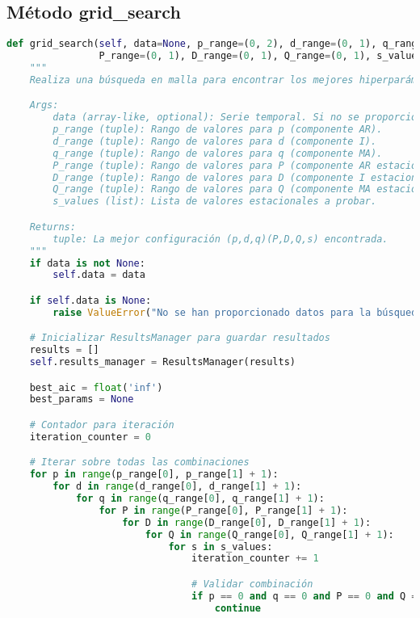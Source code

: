 \documentclass[12pt,letterpaper]{report}
\begin{document}
\subsection{Método grid\_search}
\begin{lstlisting}[language=python]
def grid_search(self, data=None, p_range=(0, 2), d_range=(0, 1), q_range=(0, 2),
                P_range=(0, 1), D_range=(0, 1), Q_range=(0, 1), s_values=[12]):
    """
    Realiza una búsqueda en malla para encontrar los mejores hiperparámetros.

    Args:
        data (array-like, optional): Serie temporal. Si no se proporciona, se usan los datos del constructor.
        p_range (tuple): Rango de valores para p (componente AR).
        d_range (tuple): Rango de valores para d (componente I).
        q_range (tuple): Rango de valores para q (componente MA).
        P_range (tuple): Rango de valores para P (componente AR estacional).
        D_range (tuple): Rango de valores para D (componente I estacional).
        Q_range (tuple): Rango de valores para Q (componente MA estacional).
        s_values (list): Lista de valores estacionales a probar.

    Returns:
        tuple: La mejor configuración (p,d,q)(P,D,Q,s) encontrada.
    """
    if data is not None:
        self.data = data

    if self.data is None:
        raise ValueError("No se han proporcionado datos para la búsqueda en malla")

    # Inicializar ResultsManager para guardar resultados
    results = []
    self.results_manager = ResultsManager(results)

    best_aic = float('inf')
    best_params = None

    # Contador para iteración
    iteration_counter = 0

    # Iterar sobre todas las combinaciones
    for p in range(p_range[0], p_range[1] + 1):
        for d in range(d_range[0], d_range[1] + 1):
            for q in range(q_range[0], q_range[1] + 1):
                for P in range(P_range[0], P_range[1] + 1):
                    for D in range(D_range[0], D_range[1] + 1):
                        for Q in range(Q_range[0], Q_range[1] + 1):
                            for s in s_values:
                                iteration_counter += 1

                                # Validar combinación
                                if p == 0 and q == 0 and P == 0 and Q == 0:
                                    continue


\end{lstlisting}
\end{document}
